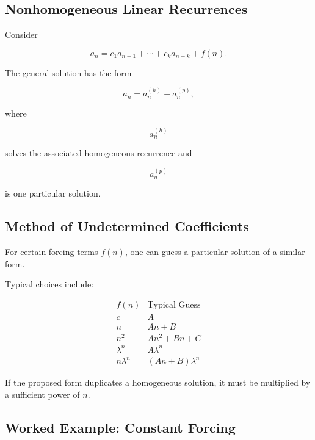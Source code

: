 \subsection{Nonhomogeneous Linear Recurrences}
\label{subsec:nonhomogeneous-linear-recurrences}

Consider

\[
\boxed{
a_n
=
c_1a_{n-1}
+\cdots+
c_ka_{n-k}
+
f(n).
}
\]

The general solution has the form

\[
\boxed{
a_n
=
a_n^{(h)}
+
a_n^{(p)},
}
\]

where

\[
a_n^{(h)}
\]

solves the associated homogeneous recurrence and

\[
a_n^{(p)}
\]

is one particular solution.

\subsection{Method of Undetermined Coefficients}
\label{subsec:undetermined-coefficients}

For certain forcing terms \(f(n)\), one can guess a particular solution
of a similar form.

Typical choices include:

\[
\begin{array}{c|c}
f(n) & \text{Typical Guess}\\
\hline
c & A\\
n & An+B\\
n^2 & An^2+Bn+C\\
\lambda^n & A\lambda^n\\
n\lambda^n & (An+B)\lambda^n
\end{array}
\]

If the proposed form duplicates a homogeneous solution, it must be
multiplied by a sufficient power of \(n\).

\subsection{Worked Example: Constant Forcing}
\label{subsec:worked-constant-forcing}

